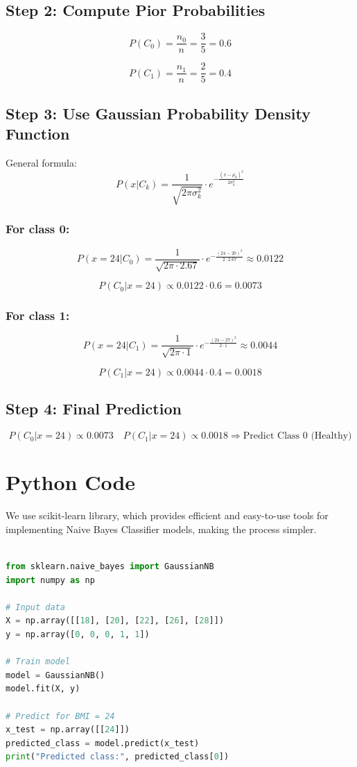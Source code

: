 \documentclass{article}
\begin{document}
\subsection*{Step 2: Compute Pior Probabilities}

$$
P(C_0) = \frac{n_0}{n} = \frac{3}{5} = 0.6
$$

$$
P(C_1) = \frac{n_1}{n} = \frac{2}{5} = 0.4
$$

\subsection*{Step 3: Use Gaussian Probability Density Function}

General formula:
$$
P(x|C_k) = \frac{1}{\sqrt{2\pi \sigma_k^2}} \cdot e^{-\frac{(x - \mu_k)^2}{2\sigma_k^2}}
$$

\subsubsection*{For class 0:}

$$
P(x=24|C_0) = \frac{1}{\sqrt{2\pi \cdot 2.67}} \cdot e^{-\frac{(24 - 20)^2}{2 \cdot 2.67}} \approx 0.0122
$$

$$
P(C_0|x=24) \propto 0.0122 \cdot 0.6 = 0.0073
$$


\subsubsection*{For class 1:}
$$
P(x=24|C_1) = \frac{1}{\sqrt{2\pi \cdot 1}} \cdot e^{-\frac{(24 - 27)^2}{2 \cdot 1}} \approx 0.0044
$$

$$
P(C_1|x=24) \propto 0.0044 \cdot 0.4 = 0.0018
$$

\subsection*{Step 4: Final Prediction}

$$
P(C_0|x=24) \propto 0.0073 \quad
P(C_1|x=24) \propto 0.0018
\Rightarrow \text{Predict Class 0 (Healthy)}
$$

\section*{Python Code}
We use scikit-learn library, which provides efficient and easy-to-use tools for implementing Naive Bayes Classifier models, making the process simpler.
\begin{lstlisting}[language=Python, caption={NBC For Continuous Random Variable}]

from sklearn.naive_bayes import GaussianNB
import numpy as np

# Input data
X = np.array([[18], [20], [22], [26], [28]])
y = np.array([0, 0, 0, 1, 1])

# Train model
model = GaussianNB()
model.fit(X, y)

# Predict for BMI = 24
x_test = np.array([[24]])
predicted_class = model.predict(x_test)
print("Predicted class:", predicted_class[0])

\end{lstlisting}
\end{document}
